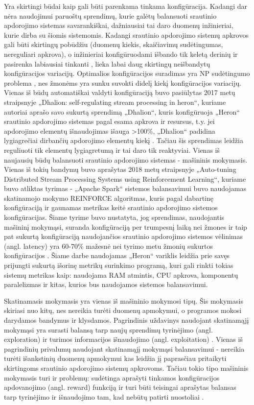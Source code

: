 \documentclass{VUMIFPSbakalaurinis}
\begin{document}
Yra skirtingi būdai kaip gali būti parenkama tinkama konfigūracija. Kadangi dar nėra naudojimui paruoštų sprendimų, kurie galėtų balansuoti srautinio apdorojimo sistemas savarankiškai, dažniausiai tai daro duomenų inžinieriai, kurie dirba su šiomis sistemomis. Kadangi srautinio apdorojimo sistemų apkrovos gali būti skirtingų pobūdžiu (duomenų kiekis, skaičiavimų sudėtingumas, nereguliari apkrova), o inžinieriai konfigūruodami išbando tik keletą derinių ir pasirenka labiausiai tinkanti \cite{selfRegulatingStreaming}, lieka labai daug skirtingų neišbandytų konfigūracijos variacijų. Optimalios konfigūracijos suradimas yra NP sudėtingumo problema \cite{automateTuning}, nes žmonėms yra sunku suvokti didelį kiekį konfigūracijos variacijų. 
Vienas iš būdų automatiškai valdyti konfigūraciją buvo pasiūlytas 2017 metų straipsnyje „Dhalion: self-regulating stream processing in heron“, kuriame autoriai aprašo savo sukurtą sprendimą „Dhalion“, kuris konfigūruoja „Heron“ srautinio apdorojimo sistemas pagal esama apkrova ir resursus, t.y. jei apdorojimo elementų išnaudojimas išauga >100\%, „Dhalion“ padidina lygiagrečiai dirbančių apdorojimo elementų kiekį \cite{dhalion}. Tačiau šis sprendimas leidžia reguliuoti tik elementų lygiagretumą ir tai daro tik reaktyviai.
Vienas iš naujausių būdų balansuoti srautinio apdorojimo sistemas - mašininis mokymasis. Vienas iš tokių bandymų buvo aprašytas 2018 metų straipsnyje „Auto-tuning Distributed Stream Processing Systems using Reinforcement Learning“, kuriame buvo atliktas tyrimas - „Apache Spark“ sistemos balansavimui buvo naudojamas skatinamojo mokymo REINFORCE algoritmas, kuris pagal dabartinę konfigūraciją ir gaunamas metrikas keitė srautinio apdorojimo sistemos konfigūracijas. Šiame tyrime buvo nustatyta, jog sprendimas, naudojantis mašininį mokymąsi, suranda konfigūraciją per trumpesnį laiką nei žmones ir taip pat sukurtą konfigūraciją naudojančios srautinio apdorojimo sistemos vėlinimas (angl. latency) yra 60-70\% mažesnė nei tyrimo metu žmonių sukurtos konfigūracijos \cite{vaquero2018autotuning}. Šiame darbe naudojamas „Heron“ variklis leidžia prie savęs prijungti sukurtą išorinę metrikų surinkimo programą, kuri gali rinkti tokias sistemų metrikas kaip: naudojama RAM atmintis, CPU apkrova, komponentų paralelizmas ir kitas, kurios bus naudojamos sistemos balansavimui. 

Skatinamasis mokymasis yra vienas iš mašininio mokymosi tipų. Šis mokymasis skiriasi nuo kitų, nes nereikia turėti duomenų apmokymui, o programos mokosi darydamos bandymus ir klysdamos. Pagrindinis uždavinys naudojant skatinamąjį mokymąsi yra surasti balansą tarp naujų sprendimų tyrinėjimo (angl. exploration) ir turimos informacijos išnaudojimo (angl. exploitation) \cite{reinforcment}. Vienas iš pagrindinių privalumų naudojant skatinamąjį mokymąsi balansavimui - nereikia turėti išankstinių duomenų apmokymui kas leidžia jį paprasčiau pritaikyti skirtingoms srautinio apdorojimo sistemų apkrovoms. Tačiau tokio tipo mašininis mokymasis turi ir problemų: sudėtinga aprašyti tinkamos konfigūracijos apdovanojimo (angl. reward) funkciją ir turi būti teisingai aprašytas balansas tarp tyrinėjimo ir išnaudojimo tam, kad nebūtų patirti nuostoliai \cite{selfRegulatingStreaming}.
\end{document}

